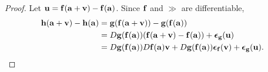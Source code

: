 \begin{proof}
    Let \(\mathbf{u} = \mathbf{f}(\mathbf{a}+\mathbf{v}) - \mathbf{f}(\mathbf{a}) \).
    Since \(\mathbf{f}\) and \(\gg\) are differentiable,
    \[
        \begin{aligned}
            \mathbf{h}(\mathbf{a}+\mathbf{v}) - \mathbf{h}(\mathbf{a})
             & = \mathbf{g}(\mathbf{f}(\mathbf{a}+\mathbf{v})) - \mathbf{g}(\mathbf{f}(\mathbf{a}))                                                                                    \\
             & = D\mathbf{g}(\mathbf{f}(\mathbf{a}))(\mathbf{f}(\mathbf{a}+\mathbf{v}) - \mathbf{f}(\mathbf{a}) ) + \boldsymbol{\epsilon}_{\mathbf{g}}(\mathbf{u})                                          \\
             & = D\mathbf{g}(\mathbf{f}(\mathbf{a}))   D\mathbf{f}(\mathbf{a}) \mathbf{v} + D\mathbf{g}(\mathbf{f}(\mathbf{a}))\boldsymbol{\epsilon}_{\mathbf{f}}(\mathbf{v})  + \boldsymbol{\epsilon}_{\mathbf{g}}(\mathbf{u}).
        \end{aligned} \qedhere
    \]
\end{proof}



